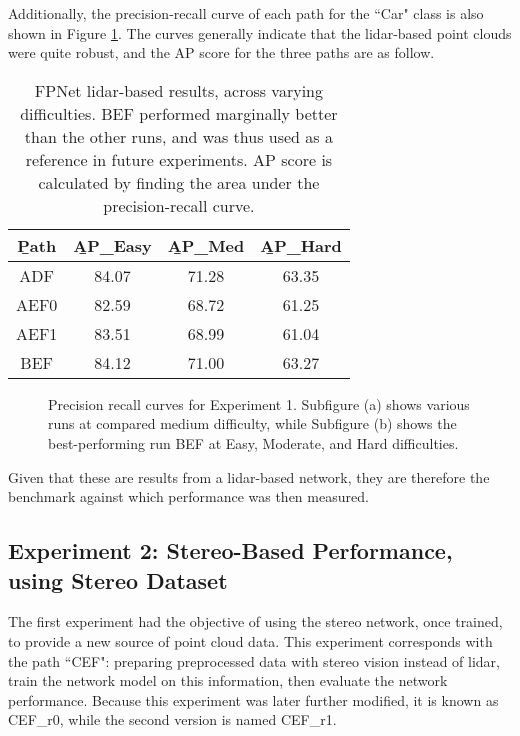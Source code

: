Additionally, the precision-recall curve of each path for the ``Car" class is also shown in Figure \ref{fpnet_pr1}. The curves generally indicate that the lidar-based point clouds were quite robust, and the AP score for the three paths are as follow.

\begin{table}[ht]
	\centering
	\caption{FPNet lidar-based results, across varying difficulties. BEF performed marginally better than the other runs, and was thus used as a reference in future experiments. AP score is calculated by finding the area under the precision-recall curve.}
	\begin{tabular}{|c|c|c|c|}
		\hline
		\b{Path} & \b{AP\_Easy} & \b{AP\_Med} & \b{AP\_Hard} \\ \hline
		  ADF    &    84.07     &    71.28    &    63.35     \\ \hline
		  AEF0   &    82.59     &    68.72    &    61.25     \\ \hline
		  AEF1   &    83.51     &    68.99    &    61.04     \\ \hline
		  BEF    &    84.12     &    71.00    &    63.27     \\ \hline
	\end{tabular}
	\label{fpnet_ap1}
\end{table}


\begin{figure}[H]
	\centering
	\caption{Precision recall curves for Experiment 1. Subfigure (a) shows various runs at compared medium difficulty, while Subfigure (b) shows the best-performing run BEF at Easy, Moderate, and Hard difficulties.}
	\label{fpnet_pr1}
\end{figure}

Given that these are results from a lidar-based network, they are therefore the benchmark against which performance was then measured. 

\subsection{Experiment 2: Stereo-Based Performance, using Stereo Dataset}
The first experiment had the objective of using the stereo network, once trained, to provide a new source of point cloud data. This experiment corresponds with the path ``CEF": preparing preprocessed data with stereo vision instead of lidar, train the network model on this information, then evaluate the network performance. Because this experiment was later further modified, it is known as CEF\_r0, while the second version is named CEF\_r1. 


